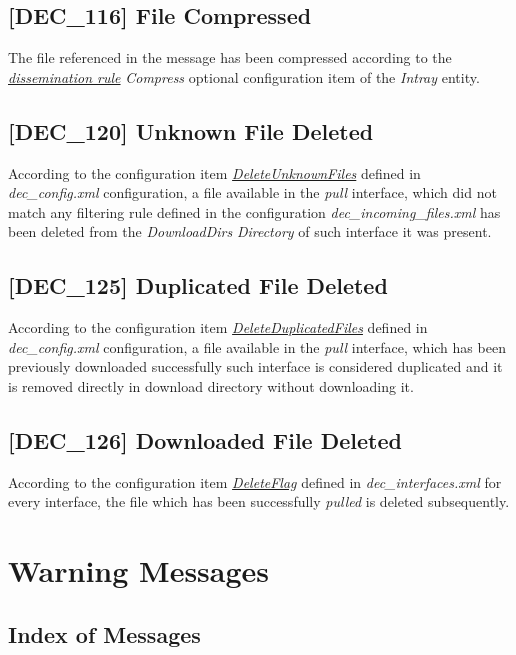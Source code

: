\documentclass[dec_sum_main.tex]{subfiles}
\begin{document}
\subsection{[DEC\_116] File Compressed}
The file referenced in the message has been compressed according to the \hyperref[Dissemination rules]{\textit{dissemination rule}} \textit{Compress} optional configuration item of the \textit{Intray} entity.

\subsection{[DEC\_120] Unknown File Deleted}
According to the configuration item \hyperref[DeleteUnknownFiles]{\textit{DeleteUnknownFiles}} defined in \textit{dec\_config.xml} configuration, a file available in the \textit{pull} interface, which did not match any filtering rule defined in the configuration \textit{dec\_incoming\_files.xml} has been deleted from the \textit{DownloadDirs} \textit{Directory} of such interface it was present.

\subsection{[DEC\_125] Duplicated File Deleted}
According to the configuration item \hyperref[DeleteDuplicatedFiles]{\textit{DeleteDuplicatedFiles}} defined in \textit{dec\_config.xml} configuration, a file available in the \textit{pull} interface, which has been previously downloaded successfully such interface is considered duplicated and it is removed directly in download directory without downloading it.

\subsection{[DEC\_126] Downloaded File Deleted}
According to the configuration item \hyperref[DeleteFlag]{\textit{DeleteFlag}} defined in \textit{dec\_interfaces.xml} for every interface, the file which has been successfully \textit{pulled} is deleted subsequently.



\section{Warning Messages}

\subsection{Index of Messages}
\end{document}
